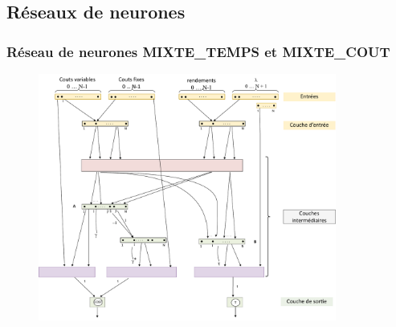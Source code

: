 \documentclass[hyperref={bookmarks=false},aspectratio=169]{beamer}
\begin{document}
\subsection{Réseaux de neurones}%
\begin{frame}
\frametitle{Réseau de neurones MIXTE\_TEMPS et MIXTE\_COUT}
\begin{figure}[H]
	\centering
		\includegraphics[width=9.8cm]{figures/slide_FNFC.pdf}
\end{figure}
\end{frame}
\end{document}
